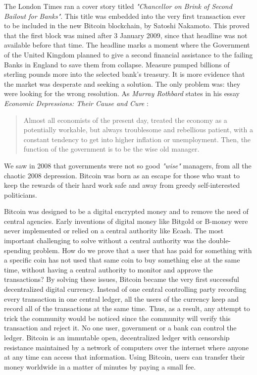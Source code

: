 \documentclass[../../thesis.tex]{subfiles}
\begin{document}
The London Times ran a cover story titled \textit{"Chancellor on Brink of Second Bailout for Banks"}\cite{theTimes}. This title was embedded into the very first transaction ever to be included in the new Bitcoin blockchain\cite{bitcoinGenesis}, by Satoshi Nakamoto. This proved that the first block was mined after 3 January 2009, since that headline was not available before that time. The headline marks a moment where the Government of the United Kingdom planned to give a second financial assistance to the failing Banks in England to save them from collapse. Measure pumped billions of sterling pounds more into the selected bank's treasury. It is more evidence that the market was desperate and seeking a solution. The only problem was: they were looking for the wrong resolution. As \textit{Murray Rothbard} states in his essay \textit{Economic Depressions: Their Cause and Cure} \cite{rothbard2009economic}:
 \begin{quotation}
  Almost all economists of the present day, treated the economy as a potentially workable, but always troublesome and rebellious patient, with a constant tendency to get into higher inflation or unemployment. Then, the function of the government is to be the wise old manager.
\end{quotation}
We saw in 2008 that governments were not so good \textit{"wise"} managers, from all the chaotic 2008 depression. Bitcoin was born as an escape for those who want to keep the rewards of their hard work safe and away from greedy self-interested politicians. 

Bitcoin was designed to be a digital encrypted money and to remove the need of central agencies. Early inventions of digital money like Bitgold\cite{szabo2008bit} or B-money\cite{dai1998b} were never implemented or relied on a central authority like Ecash\cite{chaum1995introduction}. The most important challenging to solve without a central authority was the double-spending problem. How do we prove that a user that has paid for something with a specific coin has not used that same coin to buy something else at the same time, without having a central authority to monitor and approve the transactions? By solving these issues, Bitcoin became the very first successful decentralized digital currency. Instead of one central controlling party recording every transaction in one central ledger, all the users of the currency keep and record all of the transactions at the same time. Thus, as a result, any attempt to trick the community would be noticed since the community will verify this transaction and reject it. No one user, government or a bank can control the ledger. Bitcoin is an immutable open, decentralized ledger with censorship resistance maintained by a network of computers over the internet where anyone at any time can access that information. Using Bitcoin, users can transfer their money worldwide in a matter of minutes by paying a small fee. 
\end{document}
